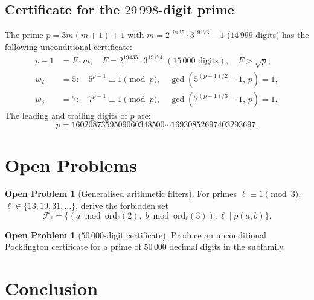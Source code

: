 \documentclass[11pt,a4paper]{article}
\theoremstyle{definition}
\newtheorem{problem}[theorem]{Open Problem}
\theoremstyle{remark}
\newcommand{\F}{\mathcal{F}}
\begin{document}
\subsection{Certificate for the $29\,998$-digit prime}

\begin{rigorousbox}
The prime $p = 3m(m+1)+1$ with $m = 2^{19435}\cdot 3^{19173}-1$
($14\,999$ digits) has the following unconditional certificate:
\begin{align*}
  p-1 &= F\cdot m,\quad F = 2^{19435}\cdot 3^{19174}
         \;(15\,000\text{ digits}),\quad F>\sqrt{p}, \\
  w_2 &= 5:\quad 5^{p-1}\equiv 1\pmod{p},\quad
         \gcd(5^{(p-1)/2}-1,\,p)=1, \\
  w_3 &= 7:\quad 7^{p-1}\equiv 1\pmod{p},\quad
         \gcd(7^{(p-1)/3}-1,\,p)=1.
\end{align*}
The leading and trailing digits of $p$ are:
\[
  p = 1602087359509060348500\cdots 16930852697403293697.
\]
\end{rigorousbox}

\section{Open Problems}\label{sec:open}

\begin{openprobbox}
\begin{problem}[Generalised arithmetic filters]\label{op:gen-filter}
For primes $\ell\equiv 1\pmod{3}$, $\ell\in\{13,19,31,\ldots\}$, derive
the forbidden set
\[
  \F_\ell = \bigl\{(a\bmod\mathrm{ord}_\ell(2),\;
                    b\bmod\mathrm{ord}_\ell(3)) : \ell\mid p(a,b)\bigr\}.
\]
\end{problem}
\end{openprobbox}

\begin{openprobbox}
\begin{problem}[$50\,000$-digit certificate]\label{op:50k}
Produce an unconditional Pocklington certificate for a prime of
$50\,000$ decimal digits in the subfamily.
\end{problem}
\end{openprobbox}

\section{Conclusion}\label{sec:conclusion}
\end{document}
